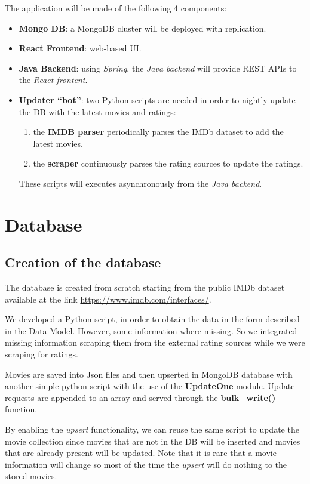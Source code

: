 \documentclass[11pt]{article}
\begin{document}
The application will be made of the following 4 components:
\begin{itemize}
	\item \textbf{Mongo DB}: a MongoDB cluster will be deployed with
		replication.
	\item \textbf{React Frontend}: web-based UI.
	\item \textbf{Java Backend}: using \emph{Spring}, the \emph{Java backend} will provide REST APIs to the \emph{React frontent}.
	\item \textbf{Updater ``bot''}: two Python scripts are needed in order to nightly update the DB with the latest movies and ratings: 
	\begin{enumerate}
		\item the \textbf{IMDB parser} periodically parses the IMDb dataset to add the latest movies.
		\item the \textbf{scraper} continuously parses the rating sources to update the ratings.
	\end{enumerate}
	These scripts will executes asynchronously from the \emph{Java backend}.
\end{itemize}


\section{Database}

\subsection{Creation of the database}
The database is created from scratch starting from the public IMDb dataset available at the link \href{https://www.imdb.com/interfaces/}{https://www.imdb.com/interfaces/}.

We developed a Python script, in order to obtain the data in the form described in the Data Model. However, some information where missing. So we integrated missing information scraping them from the external rating sources while we were scraping for ratings.

Movies are saved into Json files and then upserted in MongoDB database with another simple python script with the use of the \textbf{UpdateOne} module. Update requests are appended to an array and served through the \textbf{bulk\_write()} function.

By enabling the \emph{upsert} functionality, we can reuse the same script to 
update the movie collection since movies that are not in the DB will be
inserted and movies that are already present will be updated. Note that it is
rare that a movie information will change so most of the time the \emph{upsert}
will do nothing to the stored movies.
\end{document}
